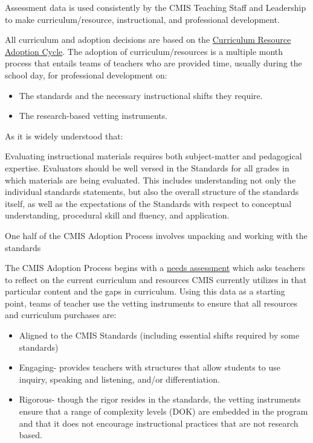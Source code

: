 \begin{findings}
Assessment data is used consistently by the CMIS Teaching Staff and Leadership to make curriculum/resource, instructional, and professional development. 


All curriculum and adoption decisions are based on the \href{https://docs.google.com/a/cmis.ac.th/document/d/1hh1nLUlJgg1hd7s6aG3u3We0L6o7Wg_ECdjc2f6DcT8/edit?usp=sharing}{Curriculum Resource Adoption Cycle}. The adoption of curriculum/resources is a multiple month process that entails teams of teachers who are provided time, usually during the school day, for professional development on:

\begin{itemize}
\item The standards and the necessary instructional shifts they require. 
\item The research-based vetting instruments. 
\end{itemize}

As it is widely understood that: 

Evaluating instructional materials requires both subject-matter and pedagogical expertise. Evaluators should be well versed in the Standards for all grades in which materials are being evaluated. This includes understanding not only the individual standards statements, but also the overall structure of the standards itself, as well as the expectations of the Standards with respect to conceptual understanding, procedural skill and fluency, and application.

One half of the CMIS Adoption Process involves unpacking and working with the standards
                                  
The CMIS Adoption Process begins with a \href{https://goo.gl/forms/wV2k8Nef218a8Tcq2}{needs assessment} which asks teachers to reflect on the current curriculum and resources CMIS currently utilizes in that particular content and the gaps in curriculum. Using this data as a starting point, teams of teacher use the vetting instruments to ensure that all resources and curriculum purchases are:

\begin{itemize}
\item Aligned to the CMIS Standards (including essential shifts required by some standards)
\item Engaging- provides teachers with structures that allow students to use inquiry, speaking and listening, and/or differentiation. 
\item Rigorous- though the rigor resides in the standards, the vetting instruments ensure that a range of complexity levels (DOK) are embedded in the program and that it does not encourage instructional practices that are not research based. 
\end{itemize}


\end{findings}
